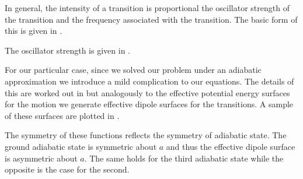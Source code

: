 % 
% 

In general, the intensity of a transition is proportional the oscillator strength of the transition and the frequency associated with the transition. The basic form of this is given in .


The oscillator strength is given in .

For our particular case, since we solved our problem under an adiabatic approximation we introduce a mild complication to our equations. The details of this are worked out in  but analogously to the effective potential energy surfaces for the \hplus{} motion we generate effective dipole surfaces for the \hplus{} transitions. A sample of these surfaces are plotted in .


The symmetry of these functions reflects the symmetry of adiabatic state. The ground adiabatic state is symmetric about $a$ and thus the effective dipole surface is asymmetric about $a$. The same holds for the third adiabatic state while the opposite is the case for the second.

% 
